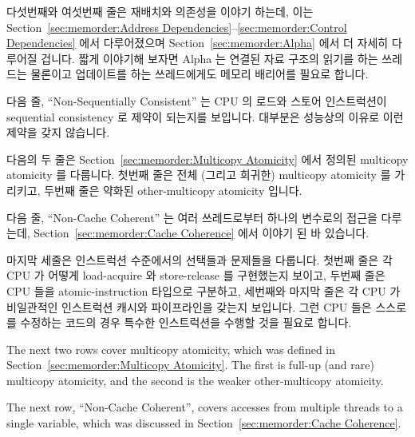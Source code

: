 다섯번째와 여섯번째 줄은 재배치와 의존성을 이야기 하는데, 이는
Section~\ref{sec:memorder:Address Dependencies}--\ref{sec:memorder:Control Dependencies}
에서 다루어졌으며
Section~\ref{sec:memorder:Alpha} 에서 더 자세히 다루어질 겁니다.
짧게 이야기해 보자면 Alpha 는 연결된 자료 구조의 읽기를 하는 쓰레드는 물론이고
업데이트를 하는 쓰레드에게도 메모리 배리어를 필요로 합니다.

다음 줄, ``Non-Sequentially Consistent'' 는 CPU 의 로드와 스토어 인스트럭션이
sequential consistency 로 제약이 되는지를 보입니다.
대부분은 성능상의 이유로 이런 제약을 갖지 않습니다.

다음의 두 줄은
Section~\ref{sec:memorder:Multicopy Atomicity} 에서 정의된 multicopy atomicity
를 다룹니다.
첫번째 줄은 전체 (그리고 희귀한) multicopy atomicity 를 가리키고, 두번째 줄은
약화된 other-multicopy atomicity 입니다.

다음 줄, ``Non-Cache Coherent'' 는 여러 쓰레드로부터 하나의 변수로의 접근을
다루는데,
Section~\ref{sec:memorder:Cache Coherence} 에서 이야기 된 바 있습니다.

마지막 세줄은 인스트럭션 수준에서의 선택들과 문제들을 다룹니다.
첫번째 줄은 각 CPU 가 어떻게 load-acquire 와 store-release 를 구현했는지
보이고, 두번째 줄은 CPU 들을 atomic-instruction 타입으로 구분하고, 세번째와
마지막 줄은 각 CPU 가 비일관적인 인스트럭션 캐시와 파이프라인을 갖는지
보입니다.
그런 CPU 들은 스스로를 수정하는 코드의 경우 특수한 인스트럭션을 수행할 것을
필요로 합니다.
\iffalse

The next two rows cover multicopy atomicity, which was defined in
Section~\ref{sec:memorder:Multicopy Atomicity}.
The first is full-up (and rare) multicopy atomicity, and the second is the
weaker other-multicopy atomicity.

The next row, ``Non-Cache Coherent'', covers accesses from multiple
threads to a single variable, which was discussed in
Section~\ref{sec:memorder:Cache Coherence}.

